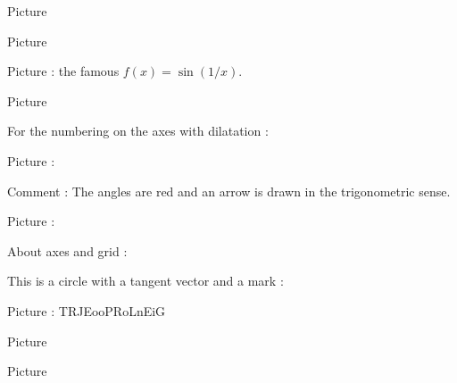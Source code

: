 Picture 
\newcommand{\CaptionFigOMPAooMbyOIqeA}{Marks are correct.}


\clearpage


Picture 
\begin{center}
   
\end{center}
   

\clearpage


Picture  : the famous \( f(x)=\sin(1/x)\).
\begin{center}
   
\end{center}
   

Picture 
\begin{center}
   
\end{center}
   

For the numbering on the axes with dilatation : 
\begin{center}
   
\end{center}



Picture : 
\begin{center}
   
\end{center}
Comment : The angles are red and an arrow is drawn in the trigonometric sense.


Picture : 
\begin{center}
   
\end{center}

About axes and grid : 
\begin{center}
   
\end{center}
   


This is a circle with a tangent vector and a mark :

Picture : TRJEooPRoLnEiG
\begin{center}
    
\end{center}



Picture 
\begin{center}
   
\end{center}

Picture 
\begin{center}
   
\end{center}


